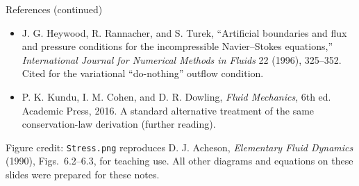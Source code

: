 \documentclass[aspectratio=169,11pt]{beamer}
\begin{document}
\begin{frame}{References (continued)}
\small
\begin{itemize}\itemsep7pt
  \item J. G. Heywood, R. Rannacher, and S. Turek, ``Artificial boundaries and flux and pressure conditions for the incompressible Navier--Stokes equations,''
  \emph{International Journal for Numerical Methods in Fluids} 22 (1996), 325--352.
  Cited for the variational ``do-nothing'' outflow condition.
  \item P. K. Kundu, I. M. Cohen, and D. R. Dowling, \emph{Fluid Mechanics}, 6th ed. Academic Press, 2016.
  A standard alternative treatment of the same conservation-law derivation (further reading).
\end{itemize}
\begin{punchbox}
\small Figure credit: \texttt{Stress.png} reproduces D. J. Acheson, \emph{Elementary Fluid Dynamics} (1990), Figs.~6.2--6.3, for teaching use. All other diagrams and equations on these slides were prepared for these notes.
\end{punchbox}
\end{frame}
\end{document}
